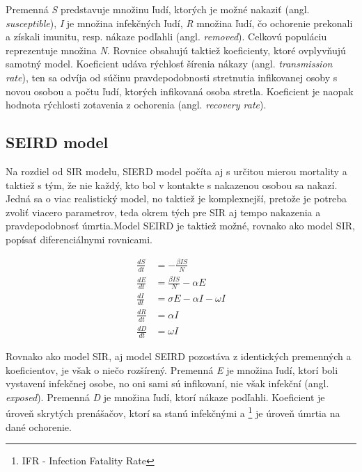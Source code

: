 \documentclass{article}
\begin{document}
\begin{sloppypar}
    Premenná \textit{S} predstavuje množinu ľudí, ktorých je možné nakaziť (angl.\textit{ susceptible}), \textit{I} je množina infekčných ľudí, \textit{R} množina ľudí, čo ochorenie prekonali a získali imunitu, resp. nákaze podľahli (angl. \textit{removed}). Celkovú populáciu reprezentuje množina \textit{N}. Rovnice obsahujú taktiež koeficienty, ktoré ovplyvňujú samotný model. Koeficient \textbeta \space udáva rýchlosť šírenia nákazy (angl. \textit{transmission rate}), ten sa odvíja od súčinu pravdepodobnosti stretnutia infikovanej osoby s novou osobou a počtu ľudí, ktorých infikovaná osoba stretla. Koeficient \textalpha je naopak hodnota rýchlosti zotavenia z ochorenia (angl. \textit{recovery rate}).

    \subsection{SEIRD model}
    Na rozdiel od SIR modelu, SIERD model počíta aj s určitou mierou mortality a taktiež s tým, že nie každý, kto bol v kontakte s nakazenou osobou sa nakazí. Jedná sa o viac realistický model, no taktiež je komplexnejší, pretože je potreba zvoliť viacero parametrov, teda okrem tých pre SIR aj tempo nakazenia a pravdepodobnosť úmrtia.Model SEIRD je taktiež možné, rovnako ako model SIR, popísať diferenciálnymi rovnicami.
    
    \begin{align}
        \frac{dS}{dt} &= -\frac{\beta IS}{N}\\
        \frac{dE}{dt} &= \frac{\beta IS}{N} - \alpha E\\
        \frac{dI}{dt} &= \sigma E - \alpha I - \omega I\\
        \frac{dR}{dt} &= \alpha I\\
        \frac{dD}{dt} &= \omega I
    \end{align}

    Rovnako ako model SIR, aj model SEIRD pozostáva z identických premenných a koeficientov, je však o niečo rozšírený. Premenná \textit{E} je množina ľudí, ktorí boli vystavení infekčnej osobe, no oni sami sú infikovaní, nie však infekční (angl. \textit{exposed}). Premenná \textit{D} je množina ľudí, ktorí nákaze podľahli. Koeficient \textsigma je úroveň skrytých prenášačov, ktorí sa stanú infekčnými a \textomega\footnote{IFR - Infection Fatality Rate} je úroveň úmrtia na dané ochorenie.
\end{sloppypar}





\medskip
{}
\printbibliography[title={Zdroje}]
\end{document}
